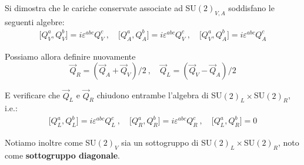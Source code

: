 \documentclass[../main.tex]{subfiles}
\begin{document}
Si dimostra che le cariche conservate associate ad SU$(2)_{V,A}$ soddisfano le seguenti algebre:
\begin{equation}
    \boxed{\begin{aligned}
        \big[{Q}^a_V,{Q}^b_V\big] = i\varepsilon^{abc}Q^c_V~,\quad
        \big[{Q}^a_A,{Q}^b_A\big] = i\varepsilon^{abc}Q^c_V~,\quad
        \big[{Q}^a_V,{Q}^b_A\big] = i\varepsilon^{abc}Q^c_A
    \end{aligned}}
    \label{eq:vector_axial_SU2charges_algebra}
\end{equation}

Possiamo allora definire nuovamente 
\[
\Vec{Q}_R = (\Vec{Q}_A + \Vec{Q}_V)/2~,\quad \Vec{Q}_L = (\Vec{Q}_V - \Vec{Q}_A)/2
\]

E verificare che $\Vec{Q}_L$ e $\Vec{Q}_R$ chiudono entrambe l'algebra di SU$(2)_L\times$SU$(2)_R$, i.e.:
\begin{equation}
    \boxed{\begin{aligned}
        \big[{Q}^a_L,{Q}^b_L\big] = i\varepsilon^{abc}Q^c_L~,\quad
        \big[{Q}^a_R,{Q}^b_R\big] = i\varepsilon^{abc}Q^c_R~,\quad
        \big[{Q}^a_L,{Q}^b_R\big] = 0
    \end{aligned}}
    \label{eq:leftright_SU2charges_algebra}
\end{equation}

Notiamo inoltre come SU$(2)_V$ sia un sottogruppo di SU$(2)_L\times$SU$(2)_R$, noto come \textbf{sottogruppo diagonale}.
\end{document}
